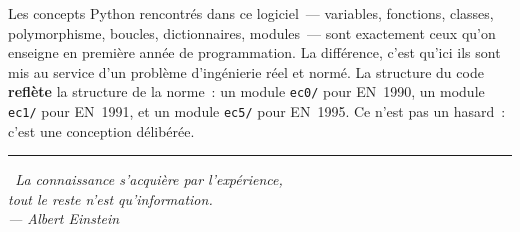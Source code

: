 \documentclass[12pt, a4paper, openany]{book}
\newcommand{\py}[1]{\texttt{#1}}
\begin{document}
\begin{important}
Les concepts Python rencontr\'es dans ce logiciel~--- variables, fonctions,
classes, polymorphisme, boucles, dictionnaires, modules~--- sont exactement
ceux qu'on enseigne en premi\`ere ann\'ee de programmation.
La diff\'erence, c'est qu'ici ils sont mis au service d'un probl\`eme
d'ing\'enierie r\'eel et norm\'e.
La structure du code \textbf{refl\`ete} la structure de la norme~:
un module \py{ec0/} pour EN~1990, un module \py{ec1/} pour EN~1991,
et un module \py{ec5/} pour EN~1995.
Ce n'est pas un hasard~: c'est une conception d\'elib\'er\'ee.
\end{important}

\vspace{2em}
\begin{center}
\rule{0.5\textwidth}{0.5pt}
\end{center}
\vspace{1em}

\begin{tcolorbox}[
  colback=bleuMaitreLight, colframe=bleuMaitre,
  width=0.9\textwidth, center
]
\centering\itshape
\guillemotleft\, La connaissance s'acqui\`ere par l'exp\'erience,\\
tout le reste n'est qu'information.\,\guillemotright\\[4pt]
{\normalsize --- Albert Einstein}
\end{tcolorbox}
\end{document}
